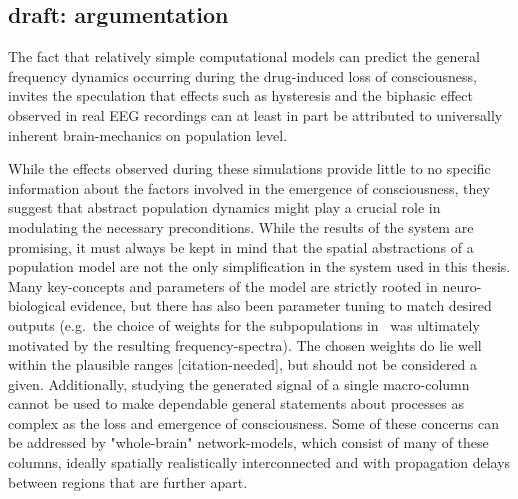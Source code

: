 
\subsection{draft: argumentation}
The fact that relatively simple computational models can predict the general frequency dynamics occurring during the
drug-induced loss of consciousness,
invites the speculation that effects such as hysteresis and the biphasic effect observed in real EEG recordings can at
least in part be attributed to universally inherent brain-mechanics on population level.

While the effects observed during these simulations provide little to no specific information about the factors
involved in the emergence of consciousness,
they suggest that abstract population dynamics might play a crucial role in modulating the necessary preconditions.
While the results of the system are promising, it must always be kept in mind that the spatial abstractions of a
population model are not the only simplification in the system used in this thesis.
Many key-concepts and parameters of the model are strictly rooted in neuro-biological evidence,
but there has also been parameter tuning to match desired outputs (e.g.\ the choice of weights for the subpopulations
in~\cite{david_neural_2003} was ultimately motivated by the resulting frequency-spectra).
The chosen weights do lie well within the plausible ranges [citation-needed],
but should not be considered a given.
Additionally, studying the generated signal of a single macro-column cannot be used to make dependable
general statements about processes as complex as the loss and emergence of consciousness.
Some of these concerns can be addressed by "whole-brain" network-models,
which consist of many of these columns, ideally spatially realistically interconnected and with propagation delays
between regions that are further apart.


